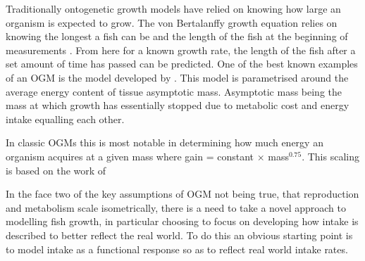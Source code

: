 \documentclass[a4paper, hidelinks]{article} %
\begin{document}
	Traditionally ontogenetic growth models have relied on knowing how large an organism is expected to grow.
	The von Bertalanffy growth equation relies on knowing the longest a fish can be and the length of the fish at the beginning of measurements \parencite{vonBertalanffy1938, Putter1918}.  From here for a known growth rate, the length of the fish after a set amount of time has passed can be predicted.
	One of the best known examples of an OGM is the model developed by \cite{West2001}.  This model is parametrised around the average energy content of tissue asymptotic mass.  Asymptotic mass being the mass at which growth has essentially stopped due to metabolic cost and energy intake equalling each other.  
	
	
	In classic OGMs this is most notable in determining how much energy an organism acquires at a given mass where gain = constant $\times$ mass$^{0.75}$.  This scaling is based on the work of \cite{West1997}
	
	In the face two of the key assumptions of \cite{Charnov2001, West2001} OGM not being true, that reproduction and metabolism scale isometrically, there is a need to take a novel approach to modelling fish growth, in particular choosing to focus on developing how intake is described to better reflect the real world.  To do this an obvious starting point is to model intake as a functional response \parencite{Holling1959} so as to reflect real world intake rates.
	
%	
%	
%	
%	
%	
%	
%	
%	
%	
%	
%	
	
\end{document}
